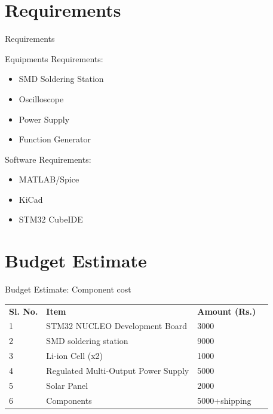 \documentclass[aspectratio=169]{beamer}
\begin{document}
\section{Requirements}
\begin{frame}{Requirements}
	\begin{minipage}{0.5\textwidth}
		Equipments Requirements:
		\begin{itemize}
			
			\item SMD Soldering Station
			\item Oscilloscope
			\item Power Supply
			\item Function Generator
		\end{itemize} 
	\end{minipage}
	\begin{minipage}{0.3\textwidth}
		Software Requirements:
		\begin{itemize}
			
			\item MATLAB/Spice
			\item KiCad
			\item STM32 CubeIDE
			
		\end{itemize} 
		
	\end{minipage}
\end{frame}



\section{Budget Estimate}
\begin{frame}{Budget Estimate: Component cost}

\begin{table}[]
	\begin{tabular}{|l|l|l|l}
		\cline{1-3}
		\textbf{Sl. No.} & \textbf{Item}                       & \textbf{Amount (Rs.)} &  \\ \cline{1-3}
		1                & STM32 NUCLEO Development Board      & 3000                  &  \\ \cline{1-3}
		2                & SMD soldering station               & 9000                  &  \\ \cline{1-3}
		3                & Li-ion Cell (x2)                  & 1000                  &  \\ \cline{1-3}
		4                & Regulated Multi-Output Power Supply & 5000                  &  \\ \cline{1-3}
		5                & Solar Panel                         & 2000                    &  \\ \cline{1-3}
		6                & Components                          & 5000+shipping         &  \\ \cline{1-3}
	\end{tabular}
\end{table}

		

\end{frame}
\end{document}

